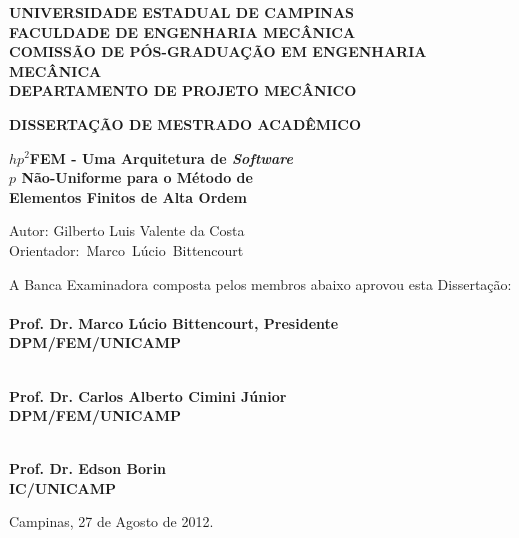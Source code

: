\begin{center}

\vspace*{1cm}
{\large\textbf{UNIVERSIDADE ESTADUAL DE CAMPINAS\\\vspace{1.2ex}
FACULDADE DE ENGENHARIA MECÂNICA\\\vspace{1.2ex}
COMISSÃO DE PÓS-GRADUAÇÃO EM ENGENHARIA MECÂNICA\\\vspace{1.2ex}
DEPARTAMENTO DE PROJETO MECÂNICO}}

\vspace{0.8cm}
\textbf{DISSERTAÇÃO DE MESTRADO ACADÊMICO}

\vspace{1.4cm}
{\fontsize{23}{23} \textbf{$hp^2$FEM - Uma Arquitetura de \textit{Software}}}	\\ \vspace{1.4ex}
{\fontsize{23}{23} \textbf{$p$ Não-Uniforme para o Método de}}			\\ \vspace{1.4ex}
{\fontsize{23}{23} \textbf{Elementos Finitos de Alta Ordem}}			\\

\begin{flushleft}
\vspace{0.2cm}
Autor: Gilberto Luis Valente da Costa\\Orientador:~Marco~Lúcio~Bittencourt

\vspace{0.4cm}
A Banca Examinadora composta pelos membros abaixo aprovou esta Dissertação:  \\

\vspace{0.6cm}
\hrulefill\\
\textbf{Prof. Dr. Marco Lúcio Bittencourt, Presidente\\
DPM/FEM/UNICAMP \\}

\vspace{0.6cm}
\hrulefill\\
\textbf{Prof. Dr. Carlos Alberto Cimini Júnior\\
DPM/FEM/UNICAMP \\}

\vspace{0.6cm}
\hrulefill\\
\textbf{Prof. Dr. Edson Borin\\
IC/UNICAMP \\}
\end{flushleft}

\begin{flushright}
\vspace{1.2cm}
Campinas, 27 de Agosto de 2012.
\end{flushright}

\end{center}


